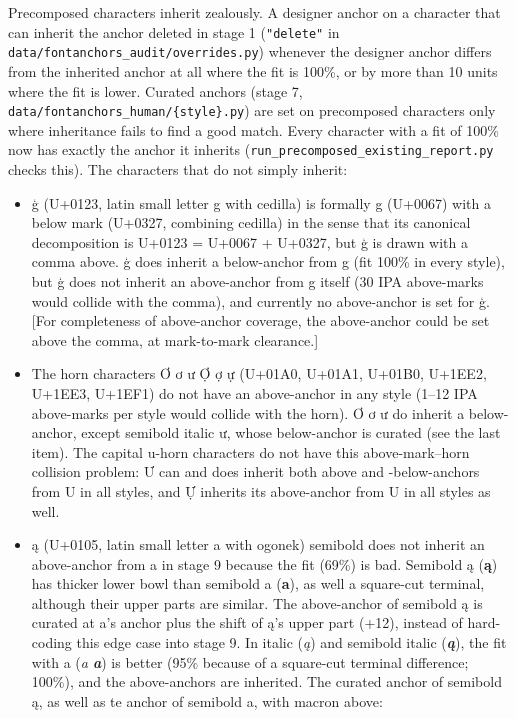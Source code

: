 \documentclass[landscape]{article}
\begin{document}
Precomposed characters inherit zealously.
A designer anchor on a character that can inherit the anchor deleted in stage 1 (\verb|"delete"| in \verb|data/fontanchors_audit/overrides.py|)
whenever the designer anchor differs from the inherited anchor at all where the fit is 100\%, or by more than 10 units where the fit is lower.
Curated anchors (stage 7, \verb|data/fontanchors_human/{style}.py|) are set on precomposed characters only where inheritance fails to find a good match.
Every character with a fit of 100\% now has exactly the anchor it inherits (\verb|run_precomposed_existing_report.py| checks this).
The characters that do not simply inherit:
\begin{itemize}
\item ģ (U+0123, latin small letter g with cedilla) is formally g (U+0067) with a below mark (U+0327, combining cedilla) 
in the sense that its canonical decomposition is U+0123 = U+0067 + U+0327, 
but ģ is drawn with a comma above. 
ģ does inherit a below-anchor from g (fit 100\% in every style), but ģ does not inherit an above-anchor from g itself 
(30 IPA above-marks would collide with the comma), 
and currently no above-anchor is set for ģ. 
[For completeness of above-anchor coverage, the above-anchor could be set above the comma, at mark-to-mark clearance.]
\item The horn characters Ơ ơ ư Ợ ợ ự (U+01A0, U+01A1, U+01B0, U+1EE2, U+1EE3, U+1EF1) do not have an above-anchor in any style 
(1--12 IPA above-marks per style would collide with the horn).
Ơ ơ ư do inherit a below-anchor, except semibold italic ư, whose below-anchor is curated (see the last item).
The capital u-horn characters do not have this above-mark--horn collision problem: Ư can and does inherit both 
above and -below-anchors from U in all styles, and Ự inherits its above-anchor from U in all styles as well.
\item ą (U+0105, latin small letter a with ogonek) semibold does not inherit an above-anchor from a in stage 9 because the fit (69\%) is bad.
Semibold ą ({\bfseries ą}) has thicker lower bowl than semibold a ({\bfseries a}), as well a square-cut terminal, although their upper parts are similar.
The above-anchor of semibold ą is curated at a's anchor plus the shift of ą's upper part (+12), instead of hard-coding this edge case into stage 9.
In italic ({\itshape ą}) and semibold italic ({\bfseries\itshape ą}), the fit with a ({\itshape a {\bfseries a}}) is better 
(95\% because of a square-cut terminal difference; 100\%), and the above-anchors are inherited. The curated anchor of semibold ą, 
as well as te anchor of semibold a, with macron above:


\end{itemize}
\end{document}
